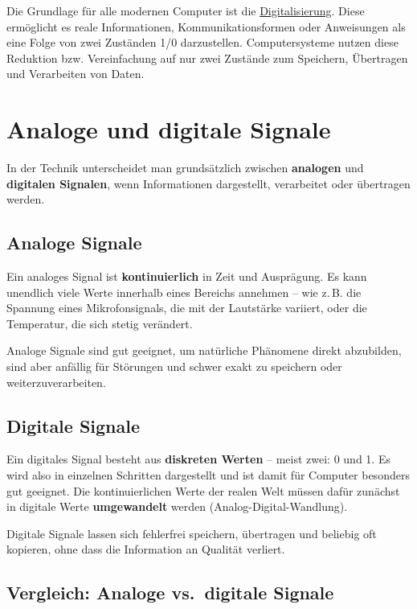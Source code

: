\documentclass[
  letterpaper,
  DIV=11,
  numbers=noendperiod]{scrreprt}
\begin{document}
Die Grundlage für alle modernen Computer ist die
\href{https://de.wikipedia.org/wiki/Digitalisierung}{Digitalisierung}.
Diese ermöglicht es reale Informationen, Kommunikationsformen oder
Anweisungen als eine Folge von zwei Zuständen 1/0 darzustellen.
Computersysteme nutzen diese Reduktion bzw. Vereinfachung auf nur zwei
Zustände zum Speichern, Übertragen und Verarbeiten von Daten.

\section{Analoge und digitale
Signale}\label{analoge-und-digitale-signale}

In der Technik unterscheidet man grundsätzlich zwischen
\textbf{analogen} und \textbf{digitalen Signalen}, wenn Informationen
dargestellt, verarbeitet oder übertragen werden.

\subsection{Analoge Signale}\label{analoge-signale}

Ein analoges Signal ist \textbf{kontinuierlich} in Zeit und Ausprägung.
Es kann unendlich viele Werte innerhalb eines Bereichs annehmen -- wie
z.\,B. die Spannung eines Mikrofonsignals, die mit der Lautstärke
variiert, oder die Temperatur, die sich stetig verändert.

Analoge Signale sind gut geeignet, um natürliche Phänomene direkt
abzubilden, sind aber anfällig für Störungen und schwer exakt zu
speichern oder weiterzuverarbeiten.

\subsection{Digitale Signale}\label{digitale-signale}

Ein digitales Signal besteht aus \textbf{diskreten Werten} -- meist
zwei: 0 und 1. Es wird also in einzelnen Schritten dargestellt und ist
damit für Computer besonders gut geeignet. Die kontinuierlichen Werte
der realen Welt müssen dafür zunächst in digitale Werte
\textbf{umgewandelt} werden (Analog-Digital-Wandlung).

Digitale Signale lassen sich fehlerfrei speichern, übertragen und
beliebig oft kopieren, ohne dass die Information an Qualität verliert.

\subsection{Vergleich: Analoge vs.~digitale
Signale}\label{vergleich-analoge-vs.-digitale-signale}
\end{document}
